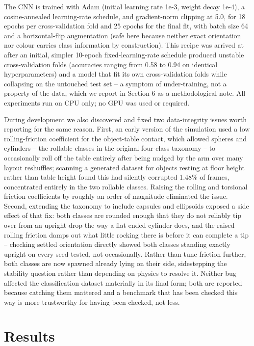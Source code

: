 \documentclass[conference]{IEEEtran}
\begin{document}
The CNN is trained with Adam (initial learning rate 1e-3, weight decay 1e-4), a cosine-annealed learning-rate schedule, and gradient-norm clipping at 5.0, for 18 epochs per cross-validation fold and 25 epochs for the final fit, with batch size 64 and a horizontal-flip augmentation (safe here because neither exact orientation nor colour carries class information by construction). This recipe was arrived at after an initial, simpler 10-epoch fixed-learning-rate schedule produced unstable cross-validation folds (accuracies ranging from 0.58 to 0.94 on identical hyperparameters) and a model that fit its own cross-validation folds while collapsing on the untouched test set -- a symptom of under-training, not a property of the data, which we report in Section 6 as a methodological note. All experiments run on CPU only; no GPU was used or required.

During development we also discovered and fixed two data-integrity issues worth reporting for the same reason. First, an early version of the simulation used a low rolling-friction coefficient for the object-table contact, which allowed spheres and cylinders -- the rollable classes in the original four-class taxonomy -- to occasionally roll off the table entirely after being nudged by the arm over many layout reshuffles; scanning a generated dataset for objects resting at floor height rather than table height found this had silently corrupted 1.48\% of frames, concentrated entirely in the two rollable classes. Raising the rolling and torsional friction coefficients by roughly an order of magnitude eliminated the issue. Second, extending the taxonomy to include capsules and ellipsoids exposed a side effect of that fix: both classes are rounded enough that they do not reliably tip over from an upright drop the way a flat-ended cylinder does, and the raised rolling friction damps out what little rocking there is before it can complete a tip -- checking settled orientation directly showed both classes standing exactly upright on every seed tested, not occasionally. Rather than tune friction further, both classes are now spawned already lying on their side, sidestepping the stability question rather than depending on physics to resolve it. Neither bug affected the classification dataset materially in its final form; both are reported because catching them mattered and a benchmark that has been checked this way is more trustworthy for having been checked, not less.

\section{Results}
\end{document}
